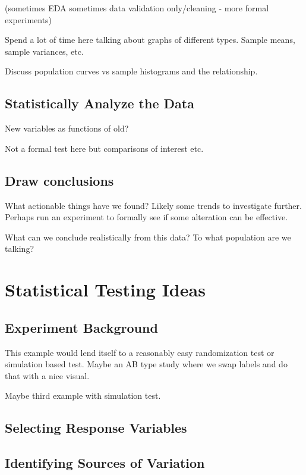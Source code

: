 \documentclass[]{book}
\begin{document}
(sometimes EDA sometimes data validation only/cleaning - more formal
experiments)

Spend a lot of time here talking about graphs of different types. Sample
means, sample variances, etc.

Discuss population curves vs sample histograms and the relationship.

\subsection{Statistically Analyze the
Data}\label{statistically-analyze-the-data}

New variables as functions of old?

Not a formal test here but comparisons of interest etc.

\subsection{Draw conclusions}\label{draw-conclusions}

What actionable things have we found? Likely some trends to investigate
further. Perhaps run an experiment to formally see if some alteration
can be effective.

What can we conclude realistically from this data? To what population
are we talking?

\section{Statistical Testing Ideas}\label{statistical-testing-ideas}

\subsection{Experiment Background}\label{experiment-background-1}

This example would lend itself to a reasonably easy randomization test
or simulation based test. Maybe an AB type study where we swap labels
and do that with a nice visual.

Maybe third example with simulation test.

\subsection{Selecting Response
Variables}\label{selecting-response-variables-1}

\subsection{Identifying Sources of
Variation}\label{identifying-sources-of-variation-1}
\end{document}

